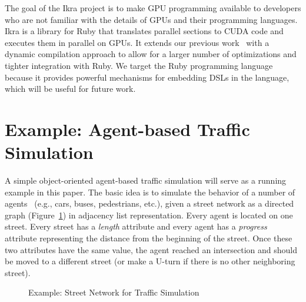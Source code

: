 \documentclass[preprint]{sigplanconf}
\begin{document}
The goal of the Ikra project is to make GPU programming available to developers who are not familiar with the details of GPUs and their programming languages. Ikra is a library for Ruby that translates parallel sections to CUDA code and executes them in parallel on GPUs. It extends our previous work~\cite{Masuhara:2012:DER:2237887.2237888} with a dynamic compilation approach to allow for a larger number of optimizations and tighter integration with Ruby. We target the Ruby programming language because it provides powerful mechanisms for embedding DSLs in the language, which will be useful for future work.

\section{Example: Agent-based Traffic Simulation}
A simple object-oriented agent-based traffic simulation will serve as a running example in this paper. The basic idea is to simulate the behavior of a number of agents~\cite{Helbing2012} (e.g., cars, buses, pedestrians, etc.), given a street network as a directed graph (Figure~\ref{fig:running_example}) in adjacency list representation. Every agent is located on one street. Every street has a \emph{length} attribute and every agent has a \emph{progress} attribute representing the distance from the beginning of the street. Once these two attributes have the same value, the agent reached an intersection and should be moved to a different street (or make a U-turn if there is no other neighboring street).

\begin{figure}[!htp]
    \centering
    
    \caption{Example: Street Network for Traffic Simulation}
    \label{fig:running_example}%
\end{figure}
\end{document}
